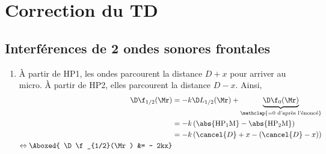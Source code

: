 \documentclass[a4paper, 12pt, final, garamond]{book}
\begin{document}
\setcounter{chapter}{1}

\chapter{Correction du TD}
\section{Interférences de 2 ondes sonores frontales}

\begin{enumerate}
    \item À partir de HP1, les ondes parcourent la distance $D+x$ pour arriver
        au micro. À partir de HP2, elles parcourent la distance $D-x$. Ainsi,
        \begin{align*}
            \D\f_{1/2}(\Mr)
                &= -k\D L_{1/2}(\Mr) + \underbrace{\D\f_0(\Mr)}_
                    {\mathclap{= 0 \text{ d'après l'énoncé}}}
            \\
                &= - k \left( {\rm \abs{HP_1M} - \abs{HP_2M}} \right)
            \\
                &= - k \left( \cancel{D}+x - (\cancel{D}-x) \right)
            \\
            \Leftrightarrow
            \Aboxed{
            \D\f_{1/2}(\Mr)
                &= - 2kx}
        \end{align*}


\end{enumerate}
\end{document}
